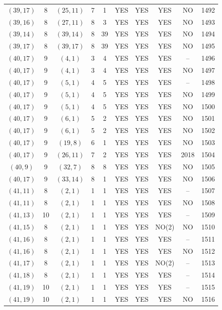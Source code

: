 \begin{longtable}{|c|c|c|c|c|c|c|c|c|c|}
$(39, 17)$ & 8 & $(25, 11)$ & 7 & 1 & YES & YES & YES & NO & 1492\\
$(39, 16)$ & 8 & $(27, 11)$ & 8 & 3 & YES & YES & YES & NO & 1493\\
$(39, 14)$ & 8 & $(39, 14)$ & 8 & 39 & YES & YES & YES & NO & 1494\\
$(39, 17)$ & 8 & $(39, 17)$ & 8 & 39 & YES & YES & YES & NO & 1495\\
$(40, 17)$ & 9 & $(4, 1)$ & 3 & 4 & YES & YES & YES & -- & 1496\\
$(40, 17)$ & 9 & $(4, 1)$ & 3 & 4 & YES & YES & YES & NO & 1497\\
$(40, 17)$ & 9 & $(5, 1)$ & 4 & 5 & YES & YES & YES & -- & 1498\\
$(40, 17)$ & 9 & $(5, 1)$ & 4 & 5 & YES & YES & YES & NO & 1499\\
$(40, 17)$ & 9 & $(5, 1)$ & 4 & 5 & YES & YES & YES & NO & 1500\\
$(40, 17)$ & 9 & $(6, 1)$ & 5 & 2 & YES & YES & YES & NO & 1501\\
$(40, 17)$ & 9 & $(6, 1)$ & 5 & 2 & YES & YES & YES & NO & 1502\\
$(40, 17)$ & 9 & $(19, 8)$ & 6 & 1 & YES & YES & YES & NO & 1503\\
$(40, 17)$ & 9 & $(26, 11)$ & 7 & 2 & YES & YES & YES & 2018 & 1504\\
$(40, 9)$ & 9 & $(32, 7)$ & 8 & 8 & YES & YES & YES & NO & 1505\\
$(40, 17)$ & 9 & $(33, 14)$ & 8 & 1 & YES & YES & YES & NO & 1506\\
$(41, 11)$ & 8 & $(2, 1)$ & 1 & 1 & YES & YES & YES & -- & 1507\\
$(41, 11)$ & 8 & $(2, 1)$ & 1 & 1 & YES & YES & YES & NO & 1508\\
$(41, 13)$ & 10 & $(2, 1)$ & 1 & 1 & YES & YES & YES & -- & 1509\\
$(41, 15)$ & 8 & $(2, 1)$ & 1 & 1 & YES & YES & NO(2) & NO & 1510\\
$(41, 16)$ & 8 & $(2, 1)$ & 1 & 1 & YES & YES & YES & -- & 1511\\
$(41, 16)$ & 8 & $(2, 1)$ & 1 & 1 & YES & YES & YES & NO & 1512\\
$(41, 17)$ & 8 & $(2, 1)$ & 1 & 1 & YES & YES & NO(2) & -- & 1513\\
$(41, 18)$ & 8 & $(2, 1)$ & 1 & 1 & YES & YES & YES & -- & 1514\\
$(41, 19)$ & 10 & $(2, 1)$ & 1 & 1 & YES & YES & YES & -- & 1515\\
$(41, 19)$ & 10 & $(2, 1)$ & 1 & 1 & YES & YES & YES & NO & 1516\\

\end{longtable}
